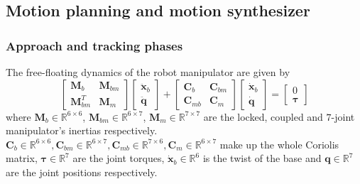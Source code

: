 \subsection{Motion planning and motion synthesizer}
%
\subsubsection{Approach and tracking phases}
The free-floating dynamics of the robot manipulator are given by~\cite[\S 55]{siciliano2016springer}
\begin{equation} \label{eq_manip_main}
  \begin{bmatrix}
    \mathbf{M}_b &     \mathbf{M}_{bm} \\     \mathbf{M}_{bm}^T &     \mathbf{M}_m  \end{bmatrix} \begin{bmatrix}
    \ddot{\mathbf{x}}_b\\ \ddot{\mathbf{q}}\end{bmatrix} + \begin{bmatrix}     \mathbf{C}_b &     \mathbf{C}_{bm} \\     \mathbf{C}_{mb} &     \mathbf{C}_m \end{bmatrix} \begin{bmatrix}
    \dot{\mathbf{x}}_b\\ \dot{\mathbf{q}} \end{bmatrix} = \begin{bmatrix}
    0\\ \mathbf{\tau}
    \end{bmatrix}
\end{equation}
where $    \mathbf{M}_b \in \mathbb{R}^{6\times 6}$, $    \mathbf{M}_{bm} \in \mathbb{R}^{6\times 7}$, $    \mathbf{M}_m \in \mathbb{R}^{7\times 7}$ are the locked, coupled and $7$-joint manipulator's inertias respectively. $\mathbf{C}_b \in \mathbb{R}^{6\times6}, \mathbf{C}_{bm} \in \mathbb{R}^{6\times7}, \mathbf{C}_{mb} \in \mathbb{R}^{7\times 6}, \mathbf{C}_m \in \mathbb{R}^{6\times7}$ make up the whole Coriolis matrix, $\mathbf{\tau} \in \mathbb{R}^7$ are the joint torques, $\dot{\mathbf{x}}_b \in \mathbb{R}^6$ is the twist of the base and $\mathbf{q} \in \mathbb{R}^7$ are the joint positions respectively. 
